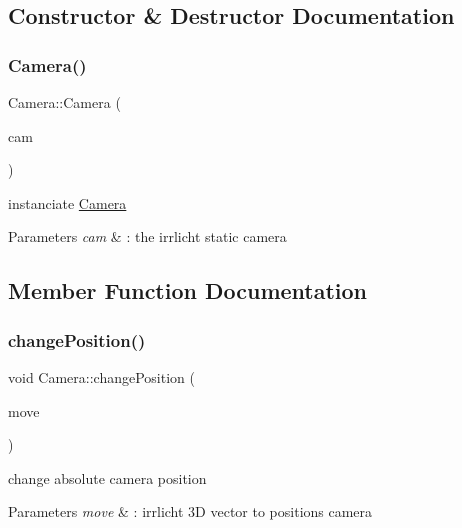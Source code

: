\subsection{Constructor \& Destructor Documentation}
\mbox{\label{classCamera_a4ffc956956f49716d7fa3bff2591cd3a}} 
\subsubsection{\texorpdfstring{Camera()}{Camera()}}
{\footnotesize\ttfamily Camera\+::\+Camera (\begin{DoxyParamCaption}\item[{irr\+::scene\+::\+I\+Camera\+Scene\+Node $\ast$const}]{cam }\end{DoxyParamCaption})}



instanciate \hyperlink{classCamera}{Camera} 


\begin{DoxyParams}{Parameters}
{\em cam} & \+: the irrlicht static camera \\
\hline
\end{DoxyParams}


\subsection{Member Function Documentation}
\mbox{\label{classCamera_ad7d58a7f1ab2b31f120a0bdad677b300}} 
\subsubsection{\texorpdfstring{change\+Position()}{changePosition()}}
{\footnotesize\ttfamily void Camera\+::change\+Position (\begin{DoxyParamCaption}\item[{irr\+::core\+::vector3df}]{move }\end{DoxyParamCaption})}



change absolute camera position 


\begin{DoxyParams}{Parameters}
{\em move} & \+: irrlicht 3D vector to positions camera \\
\hline
\end{DoxyParams}
\mbox{\label{classCamera_a8c11f289be05671191a4f91288155685}} 
